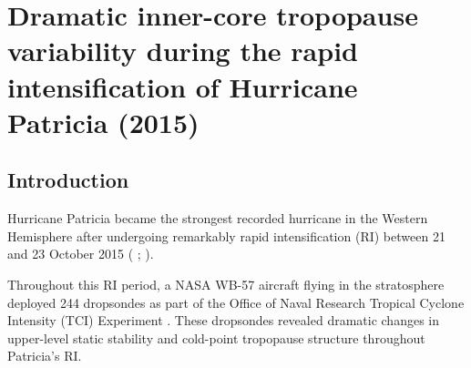  
\chapter{Dramatic inner-core tropopause variability during the rapid intensification of {Hurricane Patricia} (2015)}
\resetfootnote %

\section{Introduction}

Hurricane Patricia became the strongest recorded hurricane in the Western Hemisphere after undergoing remarkably rapid intensification (RI) between 21 and 23 October 2015 (\citeauthor{Kimberlainetal2016} \citeyear{Kimberlainetal2016}; \citeauthor{Rogersetal2017} \citeyear{Rogersetal2017}).

Throughout this RI period, a NASA WB-57 aircraft flying in the stratosphere deployed 244 dropsondes as part of the Office of Naval Research Tropical Cyclone Intensity (TCI) Experiment \cite{DoyleTCI}.
These dropsondes revealed dramatic changes in upper-level static stability and cold-point tropopause structure throughout Patricia’s RI.

